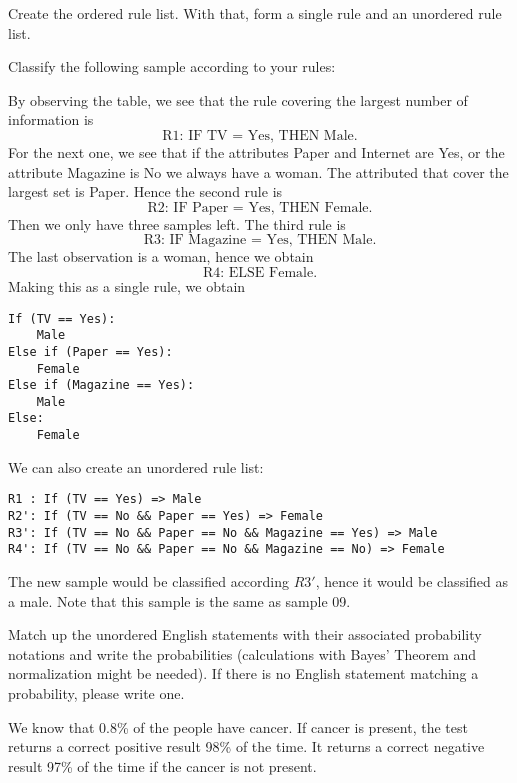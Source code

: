 \documentclass[fontsize=12pt, usenames, dvipsnames, headinclude, headsepline, footinclude, footsepline]{scrartcl}
\begin{document}
\begin{exo}
  Create the ordered rule list. With that, form a single rule and an unordered rule list. 

  Classify the following sample according to your rules:
\end{exo}

  \begin{sol}
    By observing the table, we see that the rule covering the largest number of information is 
    \[ \text{R1: IF TV = Yes, THEN Male.} \]
    For the next one, we see that if the attributes Paper and Internet are Yes, or the attribute Magazine is
    No we always have a woman. The attributed that cover the largest set is Paper. Hence the second rule is 
    \[ \text{R2: IF Paper = Yes, THEN Female.} \]
    Then we only have three samples left. The third rule is 
    \[ \text{R3: IF Magazine = Yes, THEN Male.} \]
    The last observation is a woman, hence we obtain 
    \[ \text{R4: ELSE Female.} \]
    Making this as a single rule, we obtain
\begin{verbatim}
If (TV == Yes):
    Male
Else if (Paper == Yes):
    Female
Else if (Magazine == Yes):
    Male
Else:
    Female
\end{verbatim}
    We can also create an unordered rule list:
\begin{verbatim}
R1 : If (TV == Yes) => Male
R2': If (TV == No && Paper == Yes) => Female
R3': If (TV == No && Paper == No && Magazine == Yes) => Male
R4': If (TV == No && Paper == No && Magazine == No) => Female
\end{verbatim}

    The new sample would be classified according $R3'$, hence it would be classified as a male. Note that this sample is the same as
    sample 09.
  \end{sol}



\begin{exo}
  Match up the unordered English statements with their associated probability notations and write the
  probabilities (calculations with Bayes' Theorem and normalization might be needed). If there is no English
  statement matching a probability, please write one.

  We know that 0.8\% of the people have cancer. If cancer is present, the test returns a correct positive
  result 98\% of the time. It returns a correct negative result 97\% of the time if the cancer is not present.
\end{exo}
\end{document}
